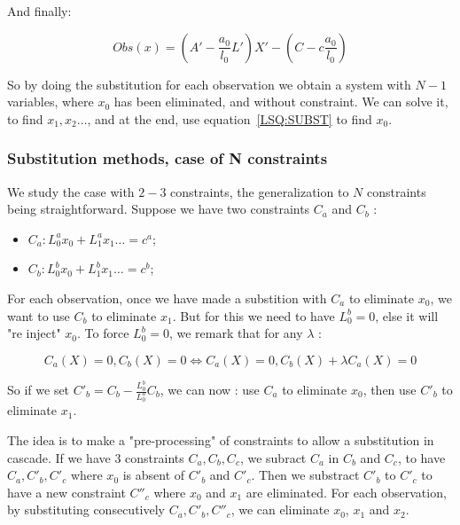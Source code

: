 And finally:

\begin{equation}
    Obs(x) = (A'- \frac{a_0}{l_0} L') X'  - (C -c\frac{a_0}{l_0})
\end{equation}

So by doing the substitution for each observation we obtain a system with $N-1$ variables,
where $x_0$ has been eliminated, and without constraint. We can solve it, to find $x_1, x_2 \dots $,
and at the end, use equation~\ref{LSQ:SUBST} to find $x_0$.



\subsubsection{Substitution methods, case of N constraints}
\label{CSTR:NSUBST}

We study the case with $2-3$ constraints, the generalization to $N$ constraints being straightforward.
Suppose we have two constraints $C_a$ and $C_b$ :

\begin{itemize}
    \item $C_a : L^a_0 x_0 +  L^a_1 x_1 \dots    = c^a$;
    \item $C_b : L^b_0 x_0 +  L^b_1 x_1 \dots    = c^b$;
\end{itemize}

For each observation, once we have made a substition with $C_a$ to eliminate $x_0$,
 we  want to use $C_b$ to eliminate $x_1$.
But for this we need to have $ L^b_0=0$, else it will "re inject" $x_0$.  To
force $L^b_0=0$, we remark  that for any $\lambda$ :

\begin{equation}
    C_a(X)=0  , C_b(X)=0   \Leftrightarrow  C_a(X)=0  , C_b(X)+\lambda C_a(X) =0
\end{equation}

So if we set $C'_b = C_b - \frac{L^b_0}{L^a_0} C_b$, we can now : use $C_a$ to eliminate $x_0$,
then use $C'_b$ to eliminate $x_1$. 

The idea is to make a "pre-processing" of constraints to allow a substitution in cascade.
If we have $3$ constraints $C_a, C_b, C_c$, we subract $C_a$ in $C_b$ and $C_c$, to have $C_a, C'_b, C'_c$
where $x_0$ is absent of $C'_b$ and $C'_c$. Then we substract  $C'_b$ to $C'_c$ to have a new constraint 
$C''_c$ where  $x_0$ and $x_1$ are eliminated.  For each observation, by substituting consecutively $C_a,C'_b,C''_c$, we can eliminate
$x_0$, $x_1$ and $x_2$.

